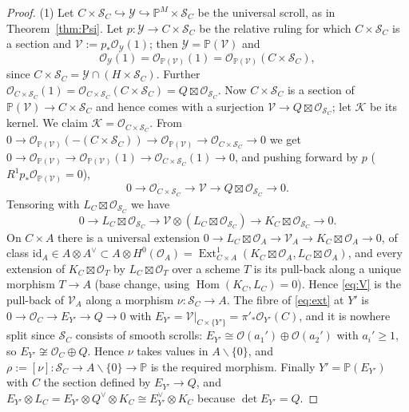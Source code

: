 \documentclass[11pt,reqno]{amsart}
\theoremstyle{plain}
\theoremstyle{definition}
\newcommand{\PP}{\mathbb{P}}
\newcommand{\PM}{\mathbb{P}^M}
\newcommand{\OO}{\mathcal{O}}
\newcommand{\Hom}{\operatorname{Hom}}
\newcommand{\Ext}{\operatorname{Ext}}
\newcommand{\id}{\mathrm{id}}
\newcommand{\SC}{\mathcal{S}_C}
\begin{document}
\begin{proof}
(1) Let $C\times\SC\hookrightarrow\mathcal{Y}\hookrightarrow\PM\times\SC$ be the universal scroll, as in Theorem~\ref{thm:Psi}. Let $p\colon\mathcal{Y}\to C\times\SC$ be the relative ruling for which $C\times\SC$ is a section and $\mathcal{V}:=p_*\OO_{\mathcal{Y}}(1)$; then $\mathcal{Y}=\PP(\mathcal{V})$ and
\[
\OO_{\mathcal{Y}}(1)=\OO_{\PP(\mathcal{V})}(1)=\OO_{\PP(\mathcal{V})}(C\times\SC),
\]
since $C\times\SC=\mathcal{Y}\cap(H\times\SC)$. Further $\OO_{C\times\SC}(1)=\OO_{C\times\SC}(C\times\SC)=Q\boxtimes\OO_{\SC}$. Now $C\times\SC$ is a section of $\PP(\mathcal{V})\to C\times\SC$ and hence comes with a surjection $\mathcal{V}\to Q\boxtimes\OO_{\SC}$; let $\mathcal{K}$ be its kernel. We claim $\mathcal{K}=\OO_{C\times\SC}$. From $0\to\OO_{\PP(\mathcal{V})}(-(C\times\SC))\to\OO_{\PP(\mathcal{V})}\to\OO_{C\times\SC}\to0$ we get $0\to\OO_{\PP(\mathcal{V})}\to\OO_{\PP(\mathcal{V})}(1)\to\OO_{C\times\SC}(1)\to0$, and pushing forward by $p$ ($R^1p_*\OO_{\PP(\mathcal{V})}=0$),
\begin{equation}\label{eq:ext}
0\to\OO_{C\times\SC}\to\mathcal{V}\to Q\boxtimes\OO_{\SC}\to0 .
\end{equation}
Tensoring with $L_C\boxtimes\OO_{\SC}$ we have
\begin{equation}\label{eq:V}
0\to L_C\boxtimes\OO_{\SC}\to\mathcal{V}\otimes(L_C\boxtimes\OO_{\SC})\to K_C\boxtimes\OO_{\SC}\to0 .
\end{equation}
On $C\times A$ there is a universal extension $0\to L_C\boxtimes\OO_A\to\mathcal{V}_A\to K_C\boxtimes\OO_A\to0$, of class $\id_A\in A\otimes A^{\vee}\subset A\otimes H^0(\OO_A)=\Ext^1_{C\times A}(K_C\boxtimes\OO_A,L_C\boxtimes\OO_A)$, and every extension of $K_C\boxtimes\OO_T$ by $L_C\boxtimes\OO_T$ over a scheme $T$ is its pull-back along a unique morphism $T\to A$ (base change, using $\Hom(K_C,L_C)=0$). Hence \eqref{eq:V} is the pull-back of $\mathcal{V}_A$ along a morphism $\nu\colon\SC\to A$. The fibre of \eqref{eq:ext} at $Y'$ is $0\to\OO_C\to E_{Y'}\to Q\to0$ with $E_{Y'}=\mathcal{V}|_{C\times\{Y'\}}=\pi'_*\OO_{Y'}(C)$, and it is nowhere split since $\SC$ consists of smooth scrolls: $E_{Y'}\cong\OO(a_1')\oplus\OO(a_2')$ with $a_i'\ge1$, so $E_{Y'}\not\cong\OO_C\oplus Q$. Hence $\nu$ takes values in $A\smallsetminus\{0\}$, and $\rho:=[\nu]\colon\SC\to A\smallsetminus\{0\}\to\PP$ is the required morphism. Finally $Y'=\PP(E_{Y'})$ with $C$ the section defined by $E_{Y'}\to Q$, and $E_{Y'}\otimes L_C=E_{Y'}\otimes Q^{\vee}\otimes K_C\cong E_{Y'}^{\vee}\otimes K_C$ because $\det E_{Y'}=Q$.


\end{proof}
\end{document}
